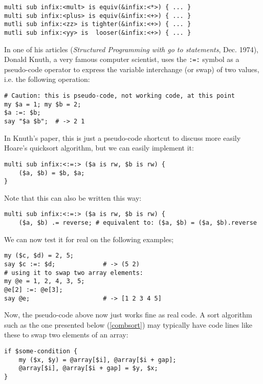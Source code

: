 \begin{verbatim}
multi sub infix:<mult> is equiv(&infix:<*>) { ... }
multi sub infix:<plus> is equiv(&infix:<+>) { ... }
mutli sub infix:<zz> is tighter(&infix:<+>) { ... }
mutli sub infix:<yy> is  looser(&infix:<+>) { ... }
\end{verbatim}

In one of his articles (\emph{Structured Programming with 
go to statements}, Dec. 1974), Donald Knuth, a very famous 
computer scientist, uses the \verb':=:' symbol as a 
pseudo-code operator to express the variable interchange 
(or swap) of two values, i.e. the following operation:

\begin{verbatim}
# Caution: this is pseudo-code, not working code, at this point
my $a = 1; my $b = 2;
$a :=: $b; 
say "$a $b";  # -> 2 1 
\end{verbatim}

In Knuth's paper, this is just a pseudo-code shortcut 
to discuss more easily Hoare's quicksort algorithm, but 
we can easily implement it:

\begin{verbatim}
multi sub infix:<:=:> ($a is rw, $b is rw) {
    ($a, $b) = $b, $a;
}
\end{verbatim}

Note that this can also be written this way:

\begin{verbatim}
multi sub infix:<:=:> ($a is rw, $b is rw) {
    ($a, $b) .= reverse; # equivalent to: ($a, $b) = ($a, $b).reverse 
\end{verbatim}

We can now test it for real on the following examples;

\begin{verbatim}
my ($c, $d) = 2, 5;
say $c :=: $d;             # -> (5 2)
# using it to swap two array elements:
my @e = 1, 2, 4, 3, 5;
@e[2] :=: @e[3];
say @e;                    # -> [1 2 3 4 5]
\end{verbatim}

Now, the pseudo-code above now just works fine as real code. 
A sort algorithm such as the one presented below 
(\ref{combsort}) may typically have code lines 
like these to swap two elements of an array:
\begin{verbatim}
if $some-condition {
    my ($x, $y) = @array[$i], @array[$i + gap];
    @array[$i], @array[$i + gap] = $y, $x;
}
\end{verbatim}

